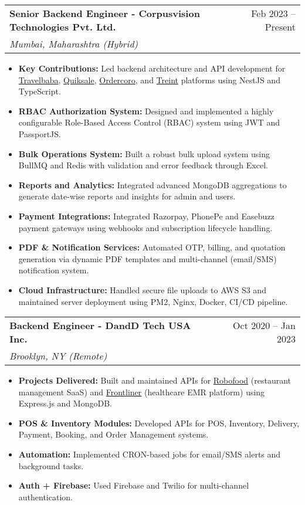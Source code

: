 \documentclass[letterpaper,11pt]{article}
\makeatletter
\newcommand{\resumeItem}[2]{
  \item\small{
    \textbf{#1:} #2 \vspace{-2pt}
  }
}
\newcommand{\resumeSubheading}[4]{
  \vspace{-1pt}\item
    \begin{tabular*}{0.97\textwidth}{l@{\extracolsep{\fill}}r}
      \textbf{#1} & #2 \\
      \textit{\small#3} & \textit{\small #4} \\
    \end{tabular*}\vspace{-5pt}
}
\newcommand{\resumeItemListStart}{\begin{itemize}}
\newcommand{\resumeItemListEnd}{\end{itemize}\vspace{-5pt}}
\makeatother
\begin{document}
\resumeSubheading
  {Senior Backend Engineer - Corpusvision Technologies Pvt. Ltd.}{Feb 2023 – Present}
  {Mumbai, Maharashtra (Hybrid)}{}
  \resumeItemListStart
    \resumeItem{Key Contributions}
      {Led backend architecture and API development for \href{https://travelbaba.ai/}{Travelbaba}, \href{https://quiksale.in/}{Quiksale}, \href{https://ordercoro.com}{Ordercoro}, and \href{https://treint.com}{Treint} platforms using NestJS and TypeScript.}
    \resumeItem{RBAC Authorization System}
      {Designed and implemented a highly configurable Role-Based Access Control (RBAC) system using JWT and PassportJS.}
    \resumeItem{Bulk Operations System}
      {Built a robust bulk upload system using BullMQ and Redis with validation and error feedback through Excel.}
    \resumeItem{Reports and Analytics}
      {Integrated advanced MongoDB aggregations to generate date-wise reports and insights for admin and users.}
    \resumeItem{Payment Integrations}
      {Integrated Razorpay, PhonePe and Easebuzz payment gateways using webhooks and subscription lifecycle handling.}
    \resumeItem{PDF & Notification Services}
      {Automated OTP, billing, and quotation generation via dynamic PDF templates and multi-channel (email/SMS) notification system.}
    \resumeItem{Cloud Infrastructure}
      {Handled secure file uploads to AWS S3 and maintained server deployment using PM2, Nginx, Docker, CI/CD pipeline.}
  \resumeItemListEnd

\resumeSubheading
  {Backend Engineer - DandD Tech USA Inc.}{Oct 2020 – Jan 2023}
  {Brooklyn, NY (Remote)}{}
  \resumeItemListStart
    \resumeItem{Projects Delivered}
      {Built and maintained APIs for \href{https://robofood.io}{Robofood} (restaurant management SaaS) and \href{https://frontliner.care}{Frontliner} (healthcare EMR platform) using Express.js and MongoDB.}
    \resumeItem{POS \& Inventory Modules}
      {Developed APIs for POS, Inventory, Delivery, Payment, Booking, and Order Management systems.}
    \resumeItem{Automation}
      {Implemented CRON-based jobs for email/SMS alerts and background tasks.}
    \resumeItem{Auth + Firebase}
      {Used Firebase and Twilio for multi-channel authentication.}
  \resumeItemListEnd
\end{document}
